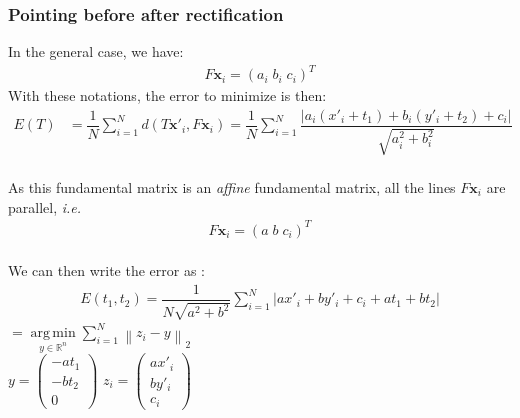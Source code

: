 \documentclass[paper=a4, fontsize=11pt]{article}
\begin{document}
\subsubsection{Pointing before after rectification}
In the general case, we have:
\begin{align*}
F\textbf{x}_i = \left( a_i \; b_i \; c_i \right)^T
\end{align*}
With these notations, the error to minimize is then:
\begin{align*}
E(T) &= \dfrac{1}{N} \sum\limits_{i=1}^{N} d(T\textbf{x}'_i, F\textbf{x}_i) = \dfrac{1}{N} \sum\limits_{i=1}^{N} \dfrac{|a_i(x'_i + t_1) + b_i(y'_i +t_2)+ c_i|}{\sqrt{a_i^2 + b_i^2}}
\end{align*}\\
As this fundamental matrix is an \textit{affine} fundamental matrix, all the lines $F\textbf{x}_i$ are parallel, \textit{i.e.} 
\begin{align*}
F\textbf{x}_i = \left( a\; b\; c_i \right)^T
\end{align*}\\
We can then write the error as :
\begin{align*}
E(t_1, t_2) = \dfrac{1}{N\sqrt{a^2 + b^2}} \sum\limits_{i=1}^{N} |ax'_i+ by'_i + c_i + at_1 + bt_2|
\end{align*}
$=\underset{y \in \mathbb{R}^n}{\operatorname{arg\,min}} \sum_{i=1}^N \left \| z_i-y \right \|_2$\\
$y = 
\begin{pmatrix} 
- at_1 \\
- bt_2 \\
0
\end{pmatrix}
$
$z_i = 
\begin{pmatrix} 
ax'_i \\
by'_i \\
c_i
\end{pmatrix}$
\end{document}
